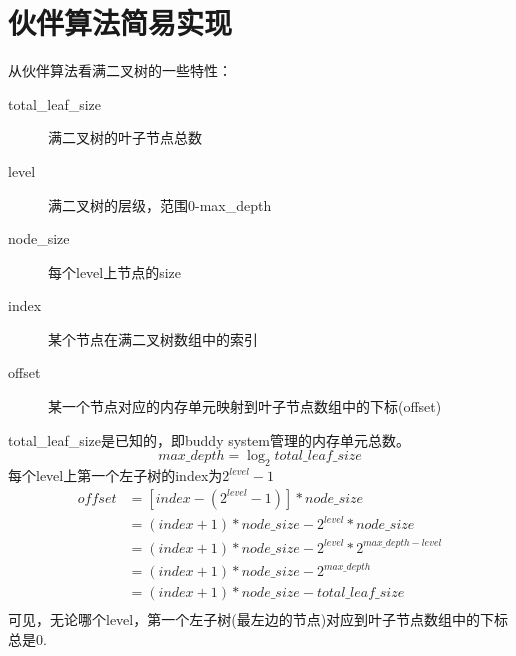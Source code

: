 ﻿
\section[伙伴算法简易实现]{伙伴算法简易实现}
\begin{center}
  
\end{center}


从伙伴算法看满二叉树的一些特性：
\begin{description}
  \item[total\_leaf\_size] 满二叉树的叶子节点总数
  \item[level] 满二叉树的层级，范围0-max\_depth
  \item[node\_size] 每个level上节点的size
  \item[index] 某个节点在满二叉树数组中的索引
  \item[offset] 某一个节点对应的内存单元映射到叶子节点数组中的下标(offset)
\end{description}
total\_leaf\_size是已知的，即buddy system管理的内存单元总数。
$$ max\_depth = \log_2total\_leaf\_size$$
每个level上第一个左子树的index为$2^{level} - 1$
\begin{align*}
  offset & = [index - (2^{level} - 1)] * node\_size \\
         & = (index + 1) * node\_size - 2^{level} * node\_size \\
         & = (index + 1) * node\_size - 2^{level} * 2^{max\_depth - level} \\
         & = (index + 1) * node\_size - 2^{max\_depth} \\
         & = (index + 1) * node\_size - total\_leaf\_size \\
\end{align*}
可见，无论哪个level，第一个左子树(最左边的节点)对应到叶子节点数组中的下标总是0.